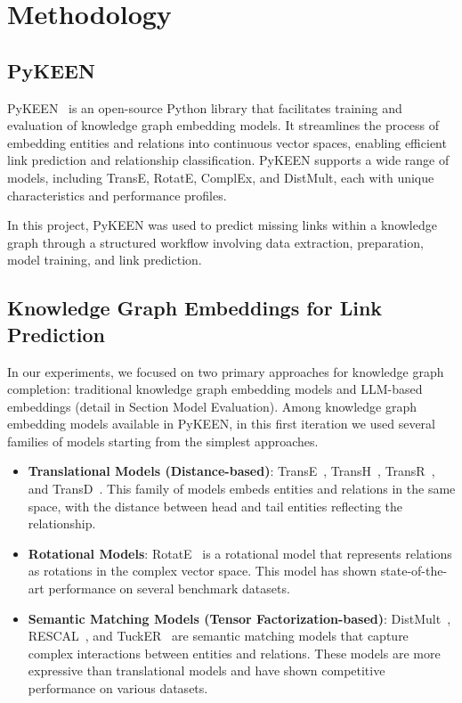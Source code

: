 \section*{Methodology}

\subsection*{PyKEEN}

PyKEEN~\cite{pykeen} is an open-source Python library that facilitates training and evaluation of knowledge graph embedding models.
It streamlines the process of embedding entities and relations into continuous vector spaces, enabling efficient link prediction and relationship classification.
PyKEEN supports a wide range of models, including TransE, RotatE, ComplEx, and DistMult, each with unique characteristics and performance profiles.

In this project, PyKEEN was used to predict missing links within a knowledge graph through a structured workflow involving data extraction, preparation, model training, and link prediction.

\subsection*{Knowledge Graph Embeddings for Link Prediction}

In our experiments, we focused on two primary approaches for knowledge graph completion: traditional knowledge graph embedding models and LLM-based embeddings (detail in Section Model Evaluation). Among knowledge graph embedding models available in PyKEEN, in this first iteration we used several families of models starting from the simplest approaches.
\begin{itemize}
    \item \textbf{Translational Models (Distance-based)}: TransE~\cite{10.5555/2999792.2999923}, TransH~\cite{10.5555/2893873.2894046}, TransR~\cite{10.5555/2886521.2886624}, and TransD~\cite{ji-etal-2015-knowledge}.
    This family of models embeds entities and relations in the same space, with the distance between head and tail entities reflecting the relationship.
    \item \textbf{Rotational Models}: RotatE~\cite{sun2019rotateknowledgegraphembedding} is a rotational model that represents relations as rotations in the complex vector space. This model has shown state-of-the-art performance on several benchmark datasets.
    \item \textbf{Semantic Matching Models (Tensor Factorization-based)}: DistMult~\cite{yang2015embeddingentitiesrelationslearning }, RESCAL~\cite{10.5555/3104482.3104584}, and TuckER~\cite{Balazevic_2019} are semantic matching models that capture complex interactions between entities and relations. These models are more expressive than translational models and have shown competitive performance on various datasets.
\end{itemize}

